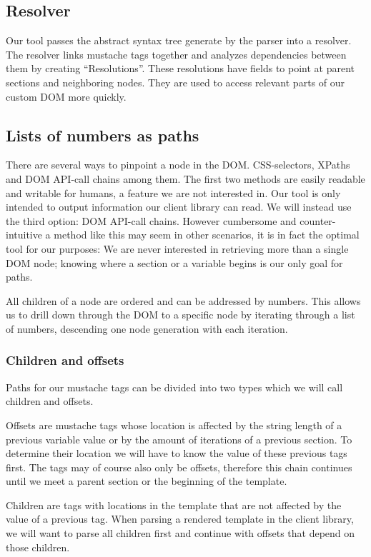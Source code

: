 \documentclass[thesis.tex]{subfiles}
\begin{document}
\subsection{Resolver}
\label{sec:resolver}
Our tool passes the abstract syntax tree generate by the parser into a resolver.
The resolver links mustache tags together and analyzes dependencies between
them by creating ``Resolutions''. These resolutions have fields to point at
parent sections and neighboring nodes. They are used to access relevant parts of
our custom DOM more quickly.

\subsection{Lists of numbers as paths}
There are several ways to pinpoint a node in the DOM. CSS-selectors, XPaths and
DOM API-call chains among them. The first two methods are easily
readable and writable for humans, a feature we are not interested in.
Our tool is only intended to output information our client library can read.
We will instead use the third option: DOM API-call chains. However cumbersome
and counter-intuitive a method like this may seem in other scenarios, it is
in fact the optimal tool for our purposes: We are never interested in retrieving
more than a single DOM node; knowing where a section or a variable begins is our
only goal for paths.

All children of a node are ordered and can be addressed by numbers. This allows
us to drill down through the DOM to a specific node by iterating through a list
of numbers, descending one node generation with each iteration.

\subsubsection{Children and offsets}
\label{sec:children-offsets}
Paths for our mustache tags can be divided into two types which we will call
children and offsets.

Offsets are mustache tags whose location is affected by the string length of a
previous variable value or by the amount of iterations of a previous section.
To determine their location we will have to know the value of these previous
tags first. The tags may of course also only be offsets, therefore this chain
continues until we meet a parent section or the beginning of the template.

Children are tags with locations in the template that are not affected by
the value of a previous tag.
When parsing a rendered template in the client library, we will want to parse
all children first and continue with offsets that depend on those children.
\end{document}
